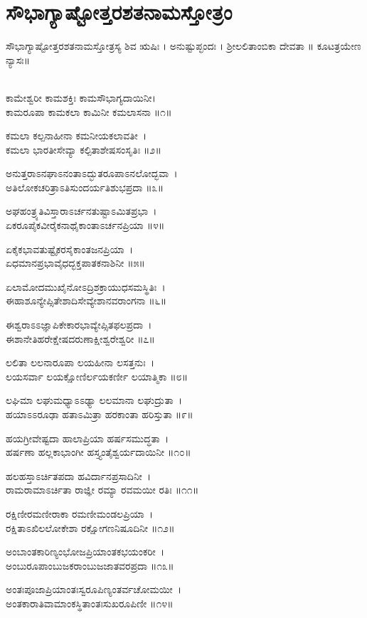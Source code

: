 \section{ಸೌಭಾಗ್ಯಾಷ್ಟೋತ್ತರಶತನಾಮಸ್ತೋತ್ರಂ }
ಸೌಭಾಗ್ಯಾಷ್ಟೋತ್ತರಶತನಾಮಸ್ತೋತ್ರಸ್ಯ ಶಿವ ಋಷಿಃ । ಅನುಷ್ಟುಪ್ಛಂದಃ । ಶ್ರೀಲಲಿತಾಂಬಿಕಾ  ದೇವತಾ ॥
ಕೂಟತ್ರಯೇಣ ನ್ಯಾಸಃ॥

\\
ಕಾಮೇಶ್ವರೀ ಕಾಮಶಕ್ತಿಃ ಕಾಮಸೌಭಾಗ್ಯದಾಯಿನೀ।\\
ಕಾಮರೂಪಾ ಕಾಮಕಲಾ ಕಾಮಿನೀ ಕಮಲಾಸನಾ ॥೧॥

ಕಮಲಾ ಕಲ್ಪನಾಹೀನಾ ಕಮನೀಯಕಲಾವತೀ~।\\
ಕಮಲಾ ಭಾರತೀಸೇವ್ಯಾ ಕಲ್ಪಿತಾಶೇಷಸಂಸೃತಿಃ ॥೨॥

ಅನುತ್ತರಾಽನಘಾಽನಂತಾಽದ್ಭುತರೂಪಾಽನಲೋದ್ಭವಾ~।\\
ಅತಿಲೋಕಚರಿತ್ರಾಽತಿಸುಂದರ್ಯತಿಶುಭಪ್ರದಾ ॥೩॥

ಅಘಹಂತ್ರ್ಯತಿವಿಸ್ತಾರಾಽರ್ಚನತುಷ್ಟಾಽಮಿತಪ್ರಭಾ~।\\
ಏಕರೂಪೈಕವೀರೈಕನಾಥೈಕಾಂತಾಽರ್ಚನಪ್ರಿಯಾ ॥೪॥

ಏಕೈಕಭಾವತುಷ್ಟೈಕರಸೈಕಾಂತಜನಪ್ರಿಯಾ~।\\
ಏಧಮಾನಪ್ರಭಾವೈಧದ್ಭಕ್ತಪಾತಕನಾಶಿನೀ ॥೫॥

ಏಲಾಮೋದಮುಖೈನೋಽದ್ರಿಶಕ್ರಾಯುಧಸಮಸ್ಥಿತಿಃ~।\\
ಈಹಾಶೂನ್ಯೇಪ್ಸಿತೇಶಾದಿಸೇವ್ಯೇಶಾನವರಾಂಗನಾ ॥೬॥

ಈಶ್ವರಾಽಽಜ್ಞಾಪಿಕೇಕಾರಭಾವ್ಯೇಪ್ಸಿತಫಲಪ್ರದಾ~।\\
ಈಶಾನೇತಿಹರೇಕ್ಷೇಷದರುಣಾಕ್ಷೀಶ್ವರೇಶ್ವರೀ ॥೭॥

ಲಲಿತಾ ಲಲನಾರೂಪಾ ಲಯಹೀನಾ ಲಸತ್ತನುಃ~।\\
ಲಯಸರ್ವಾ ಲಯಕ್ಷೋಣಿರ್ಲಯಕರ್ಣೀ ಲಯಾತ್ಮಿಕಾ ॥೮॥

ಲಘಿಮಾ ಲಘುಮಧ್ಯಾಽಽಢ್ಯಾ ಲಲಮಾನಾ ಲಘುದ್ರುತಾ~।\\
ಹಯಾಽಽರೂಢಾ ಹತಾಽಮಿತ್ರಾ ಹರಕಾಂತಾ ಹರಿಸ್ತುತಾ ॥೯॥

ಹಯಗ್ರೀವೇಷ್ಟದಾ ಹಾಲಾಪ್ರಿಯಾ ಹರ್ಷಸಮುದ್ಧತಾ~।\\
ಹರ್ಷಣಾ ಹಲ್ಲಕಾಭಾಂಗೀ ಹಸ್ತ್ಯಂತೈಶ್ವರ್ಯದಾಯಿನೀ ॥೧೦॥

ಹಲಹಸ್ತಾಽರ್ಚಿತಪದಾ ಹವಿರ್ದಾನಪ್ರಸಾದಿನೀ~।\\
ರಾಮರಾಮಾಽರ್ಚಿತಾ ರಾಜ್ಞೀ ರಮ್ಯಾ ರವಮಯೀ ರತಿಃ ॥೧೧॥

ರಕ್ಷಿಣೀರಮಣೀರಾಕಾ ರಮಣೀಮಂಡಲಪ್ರಿಯಾ~।\\
ರಕ್ಷಿತಾಽಖಿಲಲೋಕೇಶಾ ರಕ್ಷೋಗಣನಿಷೂದಿನೀ ॥೧೨॥

ಅಂಬಾಂತಕಾರಿಣ್ಯಂಭೋಜಪ್ರಿಯಾಂತಕಭಯಂಕರೀ~।\\
ಅಂಬುರೂಪಾಂಬುಜಕರಾಂಬುಜಜಾತವರಪ್ರದಾ ॥೧೩॥

ಅಂತಃಪೂಜಾಪ್ರಿಯಾಂತಃಸ್ವರೂಪಿಣ್ಯಂತರ್ವಚೋಮಯೀ~।\\
ಅಂತಕಾರಾತಿವಾಮಾಂಕಸ್ಥಿತಾಂತಃಸುಖರೂಪಿಣೀ ॥೧೪॥

